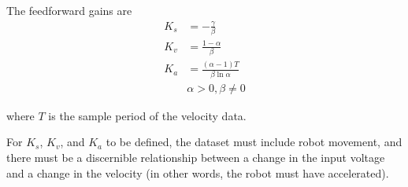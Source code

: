 The feedforward gains are
\begin{align}
  K_s &= -\frac{\gamma}{\beta} \\
  K_v &= \frac{1 - \alpha}{\beta} \\
  K_a &= \frac{(\alpha - 1) T}{\beta \ln\alpha} \\
      &\alpha > 0, \beta \neq 0 \nonumber
\end{align}

where $T$ is the sample period of the velocity data.

For $K_s$, $K_v$, and $K_a$ to be defined, the dataset must include robot
movement, and there must be a discernible relationship between a change in the
input voltage and a change in the velocity (in other words, the robot must have
accelerated).
